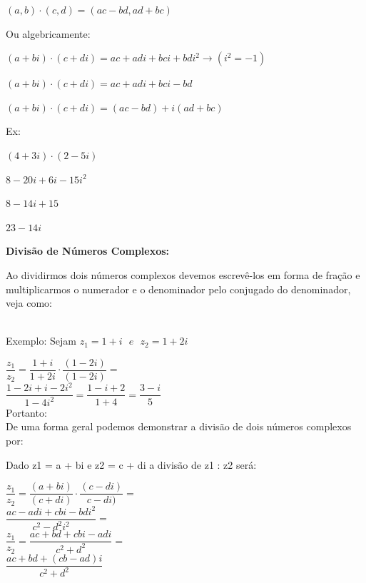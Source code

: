 \begin{multicols*}{2}
	$ (a, b) \cdot (c, d) = (ac - bd, ad + bc) $

	Ou algebricamente:

	$ (a + bi) \cdot (c + di) = ac +adi + bci +bdi^2 \longrightarrow (i^2 = -1) $

	$ (a + bi) \cdot (c + di) = ac + adi +bci - bd $

	$ (a +bi) \cdot (c + di) = (ac - bd) + i(ad + bc) $

	Ex:

	$ (4 + 3i) \cdot (2 - 5i) $

	$ 8 -20i + 6i - 15i^2 $

	$ 8 - 14i + 15 $

	$ 23 - 14i $

	\textbf{Divisão de Números Complexos:}

	Ao dividirmos dois números complexos devemos escrevê-los em forma de fração e multiplicarmos o numerador e o denominador pelo conjugado do denominador, veja como:

	\\

	Exemplo: Sejam $ z_1 = 1 + i  \ \ \  e \ \ \  z_2 = 1 +2i $

	$ \dfrac{z_1}{z_2} = \dfrac{1 + i}{1 + 2i} \cdot \dfrac{(1 - 2i)}{(1 - 2i)} = $\\

	$ \dfrac{1 - 2i + i -2i^2}{1 - 4i^2} = \dfrac{1 - i + 2}{1 +4} = \dfrac{3 - i}{5} $\\

	Portanto: \\

	De uma forma geral podemos demonstrar a divisão de dois números complexos por:

	Dado z1 = a + bi e z2 = c + di a divisão de z1 : z2 será:

	$ \dfrac{z_1}{z_2} = \dfrac{(a + bi)}{(c + di)} \cdot \dfrac{(c - di)}{c - di)} = $ \\

	$ \dfrac{ac - adi + cbi - bdi^2}{c^2 - d^2i^2} = $\\

	$ \dfrac{z_1}{z_2}= \dfrac{ac + bd + cbi - adi}{c^2 + d^2}= $\\

	$ \dfrac{ac + bd + (cb - ad)i}{c^2 + d^2} $\\


\end{multicols*}
